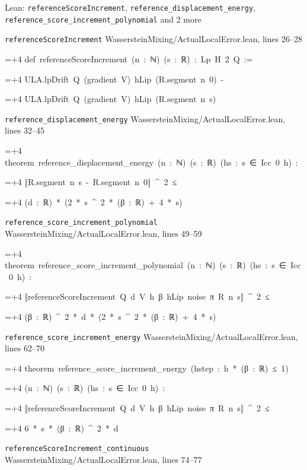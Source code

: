 \documentclass[11pt,a4paper]{report}
\newlength{\leancharwidth}
\newenvironment{leancode}{\par\smallskip\begingroup\ttfamily\footnotesize\raggedright
  \settowidth{\leancharwidth}{M}\setlength{\parskip}{0pt}\setlength{\parindent}{0pt}
  \frenchspacing}{\par\endgroup\smallskip}
\newcommand{\leanline}[2]{\hangindent=\dimexpr#1\leancharwidth+4\leancharwidth\relax
  \hangafter=1\noindent\hspace*{#1\leancharwidth}#2\par}
\newcommand{\leansource}[1]{\par{\footnotesize\color{leanmuted}#1}\par}
\begin{document}
\begin{leanbox}{Lean: \texttt{referenceScoreIncrement}, \texttt{reference\_\allowbreak{}displacement\_\allowbreak{}energy}, \texttt{reference\_\allowbreak{}score\_\allowbreak{}increment\_\allowbreak{}polynomial} and 2 more}
\leansource{\texttt{referenceScoreIncrement} \quad WassersteinMixing/\allowbreak{}ActualLocalError.lean, lines 26–28}
\begin{leancode}
\leanline{0}{def\ referenceScoreIncrement\ (n\ :\ ℕ)\ (s\ :\ ℝ)\ :\ Lp\ H\ 2\ Q\ :=}
\leanline{2}{ULA.lpDrift\ Q\ (gradient\ V)\ hLip\ (R.segment\ n\ 0)\ -}
\leanline{4}{ULA.lpDrift\ Q\ (gradient\ V)\ hLip\ (R.segment\ n\ s)}
\end{leancode}
\leansource{\texttt{reference\_\allowbreak{}displacement\_\allowbreak{}energy} \quad WassersteinMixing/\allowbreak{}ActualLocalError.lean, lines 32–45}
\begin{leancode}
\leanline{0}{theorem\ reference\_displacement\_energy\ (n\ :\ ℕ)\ (s\ :\ ℝ)\ (hs\ :\ s\ ∈\ Icc\ 0\ h)\ :}
\leanline{4}{‖R.segment\ n\ s\ -\ R.segment\ n\ 0‖\ \textasciicircum{}\ 2\ ≤}
\leanline{6}{(d\ :\ ℝ)\ *\ (2\ *\ s\ \textasciicircum{}\ 2\ *\ (β\ :\ ℝ)\ +\ 4\ *\ s)}
\end{leancode}
\leansource{\texttt{reference\_\allowbreak{}score\_\allowbreak{}increment\_\allowbreak{}polynomial} \quad WassersteinMixing/\allowbreak{}ActualLocalError.lean, lines 49–59}
\begin{leancode}
\leanline{0}{theorem\ reference\_score\_increment\_polynomial\ (n\ :\ ℕ)\ (s\ :\ ℝ)\ (hs\ :\ s\ ∈\ Icc\ 0\ h)\ :}
\leanline{4}{‖referenceScoreIncrement\ Q\ d\ V\ h\ β\ hLip\ noise\ π\ R\ n\ s‖\ \textasciicircum{}\ 2\ ≤}
\leanline{6}{(β\ :\ ℝ)\ \textasciicircum{}\ 2\ *\ d\ *\ (2\ *\ s\ \textasciicircum{}\ 2\ *\ (β\ :\ ℝ)\ +\ 4\ *\ s)}
\end{leancode}
\leansource{\texttt{reference\_\allowbreak{}score\_\allowbreak{}increment\_\allowbreak{}energy} \quad WassersteinMixing/\allowbreak{}ActualLocalError.lean, lines 62–70}
\begin{leancode}
\leanline{0}{theorem\ reference\_score\_increment\_energy\ (hstep\ :\ h\ *\ (β\ :\ ℝ)\ ≤\ 1)}
\leanline{4}{(n\ :\ ℕ)\ (s\ :\ ℝ)\ (hs\ :\ s\ ∈\ Icc\ 0\ h)\ :}
\leanline{4}{‖referenceScoreIncrement\ Q\ d\ V\ h\ β\ hLip\ noise\ π\ R\ n\ s‖\ \textasciicircum{}\ 2\ ≤}
\leanline{6}{6\ *\ s\ *\ (β\ :\ ℝ)\ \textasciicircum{}\ 2\ *\ d}
\end{leancode}
\leansource{\texttt{referenceScoreIncrement\_\allowbreak{}continuous} \quad WassersteinMixing/\allowbreak{}ActualLocalError.lean, lines 74–77}

\end{leanbox}
\end{document}
